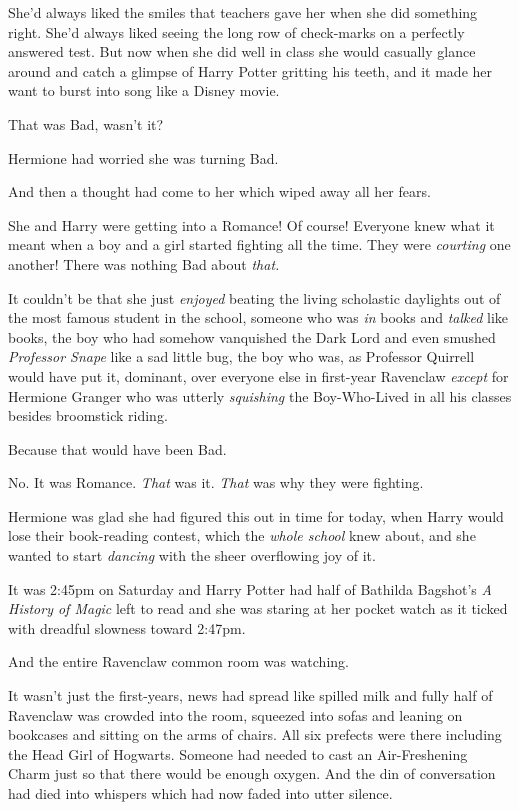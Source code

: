 She'd always liked the smiles that teachers gave her when she did something right. She'd always liked seeing the long row of check-marks on a perfectly answered test. But now when she did well in class she would casually glance around and catch a glimpse of Harry Potter gritting his teeth, and it made her want to burst into song like a Disney movie.

That was Bad, wasn't it?

Hermione had worried she was turning Bad.

And then a thought had come to her which wiped away all her fears.

She and Harry were getting into a Romance! Of course! Everyone knew what it meant when a boy and a girl started fighting all the time. They were \emph{courting} one another! There was nothing Bad about \emph{that.}

It couldn't be that she just \emph{enjoyed} beating the living scholastic daylights out of the most famous student in the school, someone who was \emph{in} books and \emph{talked} like books, the boy who had somehow vanquished the Dark Lord and even smushed \emph{Professor Snape} like a sad little bug, the boy who was, as Professor Quirrell would have put it, dominant, over everyone else in first-year Ravenclaw \emph{except} for Hermione Granger who was utterly \emph{squishing} the Boy-Who-Lived in all his classes besides broomstick riding.

Because that would have been Bad.

No. It was Romance. \emph{That} was it. \emph{That} was why they were fighting.

Hermione was glad she had figured this out in time for today, when Harry would lose their book-reading contest, which the \emph{whole school} knew about, and she wanted to start \emph{dancing} with the sheer overflowing joy of it.

It was 2:45pm on Saturday and Harry Potter had half of Bathilda Bagshot's \emph{A History of Magic} left to read and she was staring at her pocket watch as it ticked with dreadful slowness toward 2:47pm.

And the entire Ravenclaw common room was watching.

It wasn't just the first-years, news had spread like spilled milk and fully half of Ravenclaw was crowded into the room, squeezed into sofas and leaning on bookcases and sitting on the arms of chairs. All six prefects were there including the Head Girl of Hogwarts. Someone had needed to cast an Air-Freshening Charm just so that there would be enough oxygen. And the din of conversation had died into whispers which had now faded into utter silence.

